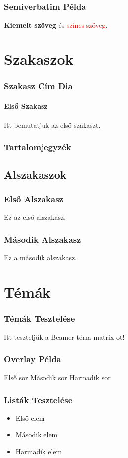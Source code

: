 \documentclass[12pt,16:9]{beamer}
\begin{document}
\begin{frame}
    \frametitle{Semiverbatim Példa}
    \begin{semiverbatim}
        \textbf{Kiemelt szöveg} és \textcolor{red}{színes szöveg}.
    \end{semiverbatim}
\end{frame}

\section{Szakaszok}

\begin{frame}
    \frametitle{Szakasz Cím Dia}
    \framesubtitle{Első Szakasz}
    Itt bemutatjuk az első szakaszt.
\end{frame}

\begin{frame}
    \frametitle{Tartalomjegyzék}
    \tableofcontents[currentsection]
\end{frame}

\subsection{Alszakaszok}
\begin{frame}
    \frametitle{Első Alszakasz}
    Ez az első alszakasz.
\end{frame}

\begin{frame}
    \frametitle{Második Alszakasz}
    Ez a második alszakasz.
\end{frame}

\section{Témák}

\begin{frame}
    \frametitle{Témák Tesztelése}
    Itt teszteljük a Beamer téma matrix-ot!
\end{frame}

\begin{frame}
    \frametitle{Overlay Példa}
    Első sor \pause
    Második sor \pause
    Harmadik sor
\end{frame}

\begin{frame}
    \frametitle{Listák Tesztelése}
    \begin{itemize}
        \item<1-> Első elem
        \item<2-> Második elem
        \item<3-> Harmadik elem
    \end{itemize}
\end{frame}
\end{document}
